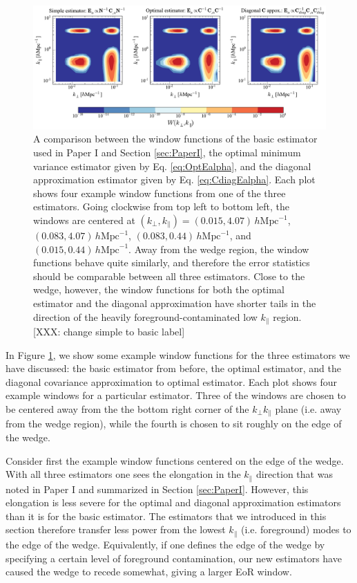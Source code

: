 \documentclass[twocolumn,aps,prd,nofootinbib,showpacs]{revtex4-1}
\begin{document}
\begin{figure}[!ht] 
	\centering 
	\includegraphics[width=1\textwidth]{figures/comparisonWindCollection.pdf}
	\caption{A comparison between the window functions of the basic estimator used in Paper I and Section \ref{sec:PaperI}, the optimal minimum variance estimator given by Eq. \eqref{eq:OptEalpha}, and the diagonal approximation estimator given by Eq. \eqref{eq:CdiagEalpha}.  Each plot shows four example window functions from one of the three estimators.  Going clockwise from top left to bottom left, the windows are centered at $(k_\perp, k_\parallel) = (0.015, 4.07)\,h\textrm{Mpc}^{-1}$, $(0.083, 4.07)\,h\textrm{Mpc}^{-1}$, $(0.083, 0.44)\,h\textrm{Mpc}^{-1}$, and $(0.015, 0.44)\,h\textrm{Mpc}^{-1}$.  Away from the wedge region, the window functions behave quite similarly, and therefore the error statistics should be comparable between all three estimators.  Close to the wedge, however, the window functions for both the optimal estimator and the diagonal approximation have shorter tails in the direction of the heavily foreground-contaminated low $k_\parallel$ region. [XXX: change simple to basic label]}
	\label{fig:comparisonWindCollection}
\end{figure} 

In Figure \ref{fig:comparisonWindCollection}, we show some example window functions for the three estimators we have discussed: the basic estimator from before, the optimal estimator, and the diagonal covariance approximation to optimal estimator.  Each plot shows four example windows for a particular estimator.  Three of the windows are chosen to be centered away from the the bottom right corner of the $k_\perp k_\parallel$ plane (i.e. away from the wedge region), while the fourth is chosen to sit roughly on the edge of the wedge.  

Consider first the example window functions centered on the edge of the wedge.  With all three estimators one sees the elongation in the $k_\parallel$ direction that was noted in Paper I and summarized in Section \ref{sec:PaperI}.  However, this elongation is less severe for the optimal and diagonal approximation estimators than it is for the basic estimator.  The estimators that we introduced in this section therefore transfer less power from the lowest $k_\parallel$ (i.e. foreground) modes to the edge of the wedge.  Equivalently, if one defines the edge of the wedge by specifying a certain level of foreground contamination, our new estimators have caused the wedge to recede somewhat, giving a larger EoR window.
\end{document}
